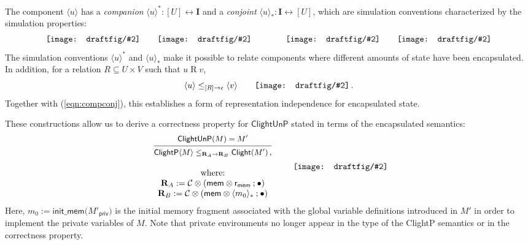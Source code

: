 \documentclass[acmsmall,screen,review,anonymous]{acmart}
\newcommand{\kw}[1]{\ensuremath{ \mathsf{#1} }}
\newcommand{\draftfig}[2]{%
  \vcenter{\hbox{%
    \texttt{[image: draftfig/\#2]}%
  }}%
}
\begin{document}
The component $\langle u \rangle$
has a \emph{companion}
$\langle u \rangle^* : [U] \leftrightarrow \mathbf{I}$
and a \emph{conjoint}
$\langle u \rangle_* : \mathbf{I} \leftrightarrow [U]$,
which are simulation conventions characterized by the simulation properties:
\begin{equation} \label{eqn:compconj}
  \draftfig{0.07}{comp1} \qquad
  \draftfig{0.07}{comp2} \qquad \qquad
  \draftfig{0.07}{conj1} \qquad
  \draftfig{0.07}{conj2}
\end{equation}
The simulation conventions $\langle u \rangle^*$
and $\langle u \rangle_*$
make it possible to relate components
where different amounts of state have been encapsulated.
In addition,
for a relation $R \subseteq U \times V$ such that $u \mathrel{R} v$,
\[
  \langle u \rangle
  \le_{[R] \rightarrow \epsilon}
  \langle v \rangle
  \qquad
  \draftfig{0.1}{encap-rel}
  \,.
\]
Together with (\ref{eqn:compconj}),
this establishes a form of representation independence
for encapsulated state.

\begin{example}
These constructions allow us to
derive a correctness property for \kw{ClightUnP}
stated in terms of the encapsulated semantics:
\[
\begin{array}{c}
  {\begin{prooftree}
    \small
    \hypo{\kw{ClightUnP}(M) = M'}
    \infer1{\kw{ClightP}\langle M \rangle
      \le_{\mathbf{R}_A \rightarrow \mathbf{R}_B}
      \kw{Clight}(M') \,,}
  \end{prooftree}} \\[2em]
  \text{where:} \\
  \mathbf{R}_A :=
    \mathcal{C} \otimes (\kw{mem} \otimes \kw{r}_\kw{mem} \mathbin; {\bullet}) \\
  \mathbf{R}_B :=
    \mathcal{C} \otimes (\kw{mem} \otimes \langle m_0 \rangle_* \mathbin; {\bullet})
\end{array}
  \qquad
  \draftfig{0.12}{encap-clightunp}
\]
Here, $m_0 := \kw{init\_mem} \big(M'_\kw{priv}\big)$
is the initial memory fragment associated with
the global variable definitions introduced in $M'$
in order to implement the private variables of $M$.
Note that private environments
no longer appear in the type of the ClightP semantics
or in the correctness property.
\end{example}

\end{document}
